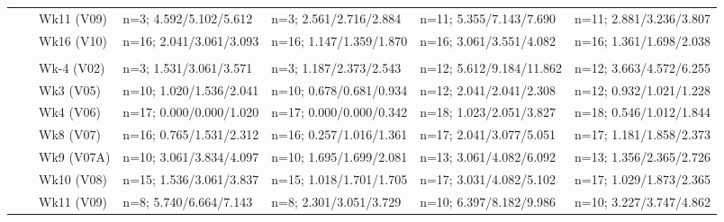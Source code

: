 \documentclass[
]{article}
\begin{document}
\begin{table}[!h]
\begin{tabular}[t]{lllllll}
\cmidrule{3-7}
\hspace{1em}\hspace{1em} &  & Wk11 (V09) & n=3; 4.592/5.102/5.612 & n=3; 2.561/2.716/2.884 & n=11; 5.355/7.143/7.690 & n=11; 2.881/3.236/3.807\\
\cmidrule{3-7}
\hspace{1em}\hspace{1em} &  & Wk16 (V10) & n=16; 2.041/3.061/3.093 & n=16; 1.147/1.359/1.870 & n=16; 3.061/3.551/4.082 & n=16; 1.361/1.698/2.038\\
\cmidrule{2-7}
\addlinespace[0.3em]
\multicolumn{7}{l}{\textit{100µg}}\\
\hspace{1em}\hspace{1em} &  & Wk-4 (V02) & n=3; 1.531/3.061/3.571 & n=3; 1.187/2.373/2.543 & n=12; 5.612/9.184/11.862 & n=12; 3.663/4.572/6.255\\
\cmidrule{3-7}
\hspace{1em}\hspace{1em} &  & Wk3 (V05) & n=10; 1.020/1.536/2.041 & n=10; 0.678/0.681/0.934 & n=12; 2.041/2.041/2.308 & n=12; 0.932/1.021/1.228\\
\cmidrule{3-7}
\hspace{1em}\hspace{1em} &  & Wk4 (V06) & n=17; 0.000/0.000/1.020 & n=17; 0.000/0.000/0.342 & n=18; 1.023/2.051/3.827 & n=18; 0.546/1.012/1.844\\
\cmidrule{3-7}
\hspace{1em}\hspace{1em} &  & Wk8 (V07) & n=16; 0.765/1.531/2.312 & n=16; 0.257/1.016/1.361 & n=17; 2.041/3.077/5.051 & n=17; 1.181/1.858/2.373\\
\cmidrule{3-7}
\hspace{1em}\hspace{1em} &  & Wk9 (V07A) & n=10; 3.061/3.834/4.097 & n=10; 1.695/1.699/2.081 & n=13; 3.061/4.082/6.092 & n=13; 1.356/2.365/2.726\\
\cmidrule{3-7}
\hspace{1em}\hspace{1em} &  & Wk10 (V08) & n=15; 1.536/3.061/3.837 & n=15; 1.018/1.701/1.705 & n=17; 3.031/4.082/5.102 & n=17; 1.029/1.873/2.365\\
\cmidrule{3-7}
\hspace{1em}\hspace{1em} &  & Wk11 (V09) & n=8; 5.740/6.664/7.143 & n=8; 2.301/3.051/3.729 & n=10; 6.397/8.182/9.986 & n=10; 3.227/3.747/4.862\\

\end{tabular}
\end{table}
\end{document}
